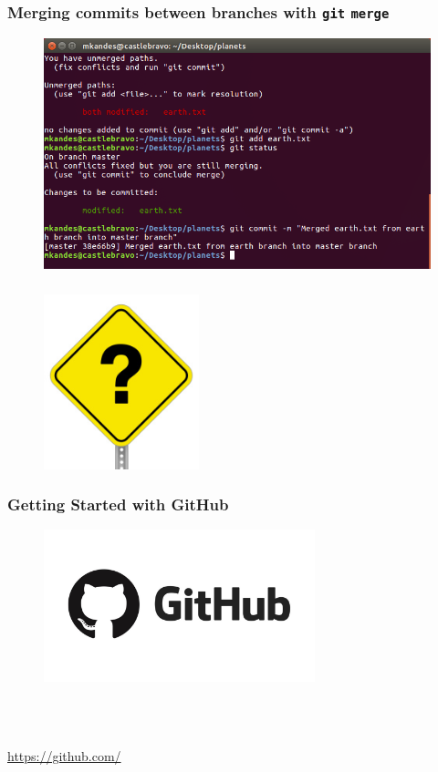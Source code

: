 \documentclass{beamer}
\begin{document}
\begin{frame}
   \frametitle{Merging commits between branches with \texttt{git} \texttt{merge}}
   \begin{figure}[htbp]
      \includegraphics[width=1.0\textwidth]{images/git-merge-with-conflict-part2.png}
   \end{figure}
\end{frame}

\begin{frame}
   \frametitle{}
   \vspace{-1.0em}
   \begin{figure}[htbp]
      \includegraphics[width=0.4\textwidth]{images/question-mark-sign.jpg}
   \end{figure}
\end{frame}

\begin{frame}
   \frametitle{Getting Started with GitHub}
   \begin{figure}[htbp]
      \includegraphics[width=0.7\textwidth]{images/github-logo.jpg}
   \end{figure}
   \ \\ \ \\
   \begin{center}
      \url{https://github.com/}
   \end{center}
\end{frame}
\end{document}
